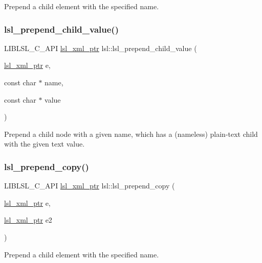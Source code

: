 Prepend a child element with the specified name. \mbox{\label{namespacelsl_a40369db591e0a19927d76b6d5c811a94}} 
\subsubsection{\texorpdfstring{lsl\+\_\+prepend\+\_\+child\+\_\+value()}{lsl\_prepend\_child\_value()}}
{\footnotesize\ttfamily L\+I\+B\+L\+S\+L\+\_\+\+C\+\_\+\+A\+PI \hyperlink{namespacelsl_a5edc7a49a1a1be1634fe6dce3d59c59b}{lsl\+\_\+xml\+\_\+ptr} lsl\+::lsl\+\_\+prepend\+\_\+child\+\_\+value (\begin{DoxyParamCaption}\item[{\hyperlink{namespacelsl_a5edc7a49a1a1be1634fe6dce3d59c59b}{lsl\+\_\+xml\+\_\+ptr}}]{e,  }\item[{const char $\ast$}]{name,  }\item[{const char $\ast$}]{value }\end{DoxyParamCaption})}

Prepend a child node with a given name, which has a (nameless) plain-\/text child with the given text value. \mbox{\label{namespacelsl_a6f0ee82a8282d19f01ddb2654f367e6c}} 
\subsubsection{\texorpdfstring{lsl\+\_\+prepend\+\_\+copy()}{lsl\_prepend\_copy()}}
{\footnotesize\ttfamily L\+I\+B\+L\+S\+L\+\_\+\+C\+\_\+\+A\+PI \hyperlink{namespacelsl_a5edc7a49a1a1be1634fe6dce3d59c59b}{lsl\+\_\+xml\+\_\+ptr} lsl\+::lsl\+\_\+prepend\+\_\+copy (\begin{DoxyParamCaption}\item[{\hyperlink{namespacelsl_a5edc7a49a1a1be1634fe6dce3d59c59b}{lsl\+\_\+xml\+\_\+ptr}}]{e,  }\item[{\hyperlink{namespacelsl_a5edc7a49a1a1be1634fe6dce3d59c59b}{lsl\+\_\+xml\+\_\+ptr}}]{e2 }\end{DoxyParamCaption})}

Prepend a child element with the specified name. \mbox{\label{namespacelsl_a61acf3af105e47f718bbc312766caf44}} 

